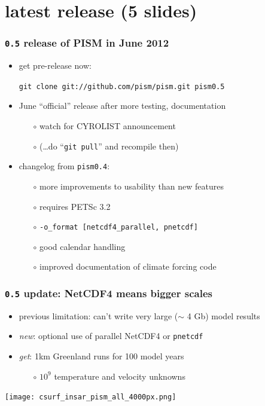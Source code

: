 \documentclass[hide notes,intlimits]{beamer}
\begin{document}
\section[latest release]{latest release  (5 slides)}

\begin{frame}
  \frametitle{\texttt{0.5} release of PISM in June 2012}

  \begin{itemize}
  \item get pre-release \alert{now}:
    \begin{center}
    \texttt{git clone git://github.com/pism/pism.git pism0.5}
    \end{center}
  \item June ``official'' release after more testing, documentation
    \begin{itemize}
    \item[$\circ$] watch for CYROLIST announcement
    \item[$\circ$] (\dots do ``\texttt{git pull}'' and recompile then)
    \end{itemize}
  \item changelog from \texttt{pism0.4}:
    \begin{itemize}
    \item[$\circ$] more improvements to usability than new features
    \item[$\circ$] requires PETSc 3.2
    \item[$\circ$] \texttt{-o\_format [netcdf4\_parallel, pnetcdf]}
    \item[$\circ$] good calendar handling
    \item[$\circ$] improved documentation of climate forcing code
    \end{itemize}
  \end{itemize}
\end{frame}


\begin{frame}
  \frametitle{\texttt{0.5} update: NetCDF4 means bigger scales}

\vspace{-1mm}
  \begin{itemize}
  \item previous limitation: can't write very large ($\sim$ 4 Gb) model results
  \item \emph{new}: optional use of parallel NetCDF4 or \texttt{pnetcdf}
  \item \emph{get}: 1km Greenland runs for 100 model years
    \scriptsize
    \begin{itemize}
    \item[$\circ$] $10^9$ temperature and velocity unknowns
    \end{itemize}
    \normalsize
  \end{itemize}
  
    \vspace{-2mm}
    \begin{center}
    \texttt{[image: csurf\_insar\_pism\_all\_4000px.png]}
    \end{center}
\end{frame}
\end{document}
